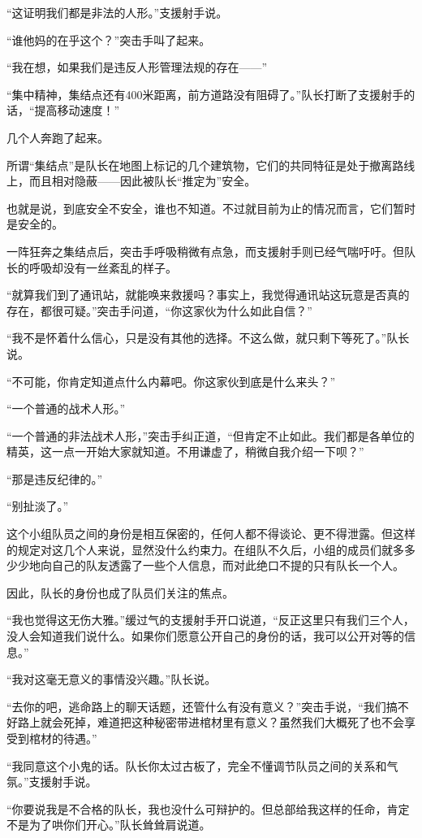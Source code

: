 “这证明我们都是非法的人形。”支援射手说。

“谁他妈的在乎这个？”突击手叫了起来。

“我在想，如果我们是违反人形管理法规的存在——”

“集中精神，集结点还有400米距离，前方道路没有阻碍了。”队长打断了支援射手的话，“提高移动速度！”

几个人奔跑了起来。

所谓“集结点”是队长在地图上标记的几个建筑物，它们的共同特征是处于撤离路线上，而且相对隐蔽——因此被队长“推定为”安全。

也就是说，到底安全不安全，谁也不知道。不过就目前为止的情况而言，它们暂时是安全的。

一阵狂奔之集结点后，突击手呼吸稍微有点急，而支援射手则已经气喘吁吁。但队长的呼吸却没有一丝紊乱的样子。

“就算我们到了通讯站，就能唤来救援吗？事实上，我觉得通讯站这玩意是否真的存在，都很可疑。”突击手问道，“你这家伙为什么如此自信？”

“我不是怀着什么信心，只是没有其他的选择。不这么做，就只剩下等死了。”队长说。

“不可能，你肯定知道点什么内幕吧。你这家伙到底是什么来头？”

“一个普通的战术人形。”

“一个普通的非法战术人形，”突击手纠正道，“但肯定不止如此。我们都是各单位的精英，这一点一开始大家就知道。不用谦虚了，稍微自我介绍一下呗？”

“那是违反纪律的。”

“别扯淡了。”

这个小组队员之间的身份是相互保密的，任何人都不得谈论、更不得泄露。但这样的规定对这几个人来说，显然没什么约束力。在组队不久后，小组的成员们就多多少少地向自己的队友透露了一些个人信息，而对此绝口不提的只有队长一个人。

因此，队长的身份也成了队员们关注的焦点。

“我也觉得这无伤大雅。”缓过气的支援射手开口说道，“反正这里只有我们三个人，没人会知道我们说什么。如果你们愿意公开自己的身份的话，我可以公开对等的信息。”

“我对这毫无意义的事情没兴趣。”队长说。

“去你的吧，逃命路上的聊天话题，还管什么有没有意义？”突击手说，“我们搞不好路上就会死掉，难道把这种秘密带进棺材里有意义？虽然我们大概死了也不会享受到棺材的待遇。”

“我同意这个小鬼的话。队长你太过古板了，完全不懂调节队员之间的关系和气氛。”支援射手说。

“你要说我是不合格的队长，我也没什么可辩护的。但总部给我这样的任命，肯定不是为了哄你们开心。”队长耸耸肩说道。

